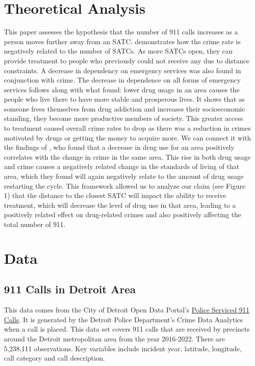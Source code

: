 \documentclass[12pt]{article}
\begin{document}
\section{Theoretical Analysis}
\label{sec:theory}
This paper assesses the hypothesis that the number of 911 calls increases as a person moves further away from an SATC. \cite{SAT_centers_and_crime} demonstrates how the crime rate is negatively related to the number of SATCs. As more SATCs open, they can provide treatment to people who previously could not receive any due to distance constraints. A decrease in dependency on emergency services was also found in conjunction with crime. The decrease in dependence on all forms of emergency services follows along with what \cite{Socioeconomic-Determinants} found: lower drug usage in an area causes the people who live there to have more stable and prosperous lives. It shows that as someone frees themselves from drug addiction and increases their socioeconomic standing, they become more productive members of society. This greater access to treatment caused overall crime rates to drop as there was a reduction in crimes motivated by drugs or getting the money to acquire more. We can connect it with the findings of \cite{drugs_and_crime}, who found that a decrease in drug use for an area positively correlates with the change in crime in the same area. This rise in both drug usage and crime causes a negatively related change in the standards of living of that area, which they found will again negatively relate to the amount of drug usage restarting the cycle. This framework allowed us to analyze our claim (see Figure 1) that the distance to the closest SATC will impact the ability to receive treatment, which will decrease the level of drug use in that area, leading to a positively related effect on drug-related crimes and also positively affecting the total number of 911.



\section{Data}
\label{sec:data}

\subsection{911 Calls in Detroit Area}

This data comes from the City of Detroit Open Data Portal's   \href{https://data.detroitmi.gov/datasets/detroitmi::police-serviced-911-calls/about}{Police Serviced 911 Calls}. It is generated by the Detroit Police Department's Crime Data Analytics when a call is placed. This data set covers 911 calls that are received by precincts around the Detroit metropolitan area from the year 2016-2022. There are 5,238,111 observations. Key variables include incident year, latitude, longitude, call category and call description. 
\end{document}
